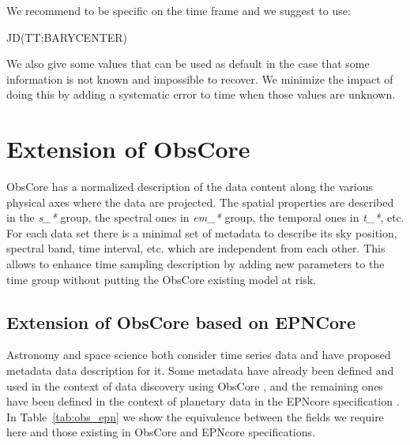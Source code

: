 \documentclass[11pt,a4paper]{ivoa}
\begin{document}
We recommend to be specific on the time frame and we suggest to use:
\begin{center}
  JD(TT;BARYCENTER)
\end{center}
We also give some values that can be used as default in the case that some information is not known and impossible to recover. We minimize the impact of doing this by adding a systematic error to time when those values are unknown. 

\section{Extension of ObsCore}
ObsCore has a normalized description of the data content along the various physical axes where the data are projected. 
The spatial properties are described in the \emph{s\_*} group, the spectral ones in \emph{em\_*} group, the temporal ones in \emph{t\_*}, etc.
For each data set there is a minimal  set of metadata to describe its sky position, spectral band, time interval, etc. which are independent from each other.
This allows to enhance time sampling description by adding new parameters to the time group without putting the ObsCore existing model at risk. 

\subsection{Extension of ObsCore based on EPNCore}
Astronomy and space science both consider time series data and have proposed metadata data description for it. Some metadata have already been defined and used in the context of data discovery using ObsCore \cite{2017ivoa.spec.0509L}, and the remaining ones have been defined in the context of planetary data in the EPNcore specification \cite{2022ivoa.spec.0822E}. In Table~\ref{tab:obs_epn} we show the equivalence between the fields we require here and those existing in  ObsCore and EPNcore specifications. 
\end{document}
